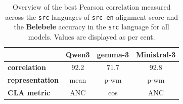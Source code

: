 \setlength{\tabcolsep}{4.5pt}
\begin{table}[ht]
    \centering\footnotesize
    \begin{tabularx}{\columnwidth}%
    {X | c  c c}
        \toprule
         & \textbf{Qwen3} & \textbf{gemma-3} & \textbf{Ministral-3} \\
        \midrule
        \textbf{correlation} & 92.2 & 71.7 & 92.8 \\
        \textbf{representation} & mean & p-wm & p-wm \\
        \textbf{CLA metric} & ANC & cos & ANC \\
        \bottomrule
    \end{tabularx}
    \caption{Overview of the best Pearson correlation measured across the \texttt{src} languages of \texttt{src-en} alignment score and the \textbf{{Belebele}} accuracy in the \texttt{src} language for all models. Values are displayed as per cent.}
    \label{tab:overview-corr-en-task-belebele}
\end{table}